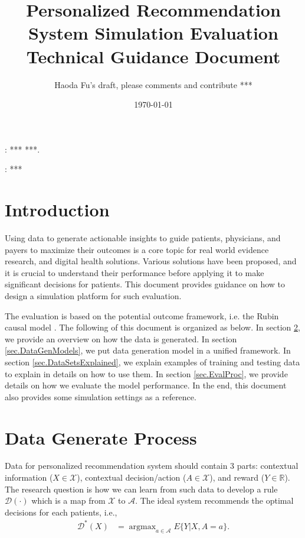 \documentclass[12pt]{article}
\DeclareMathOperator*{\argmax}{argmax}
\def\cal{\mathcal}
\def\calA{{\cal A}} %
\def\calX{{\cal X}} %
\def\calD{{\cal D}} %
\def\bbR{{\mathbb{R}}} %
\begin{document}
\title
{\bf Personalized Recommendation System Simulation Evaluation Technical Guidance Document}
\author
{
Haoda Fu's draft, please comments and contribute *** \\
}
\date{\today}
\maketitle
\begin{abstract}

\end{abstract}

: *** ***.

: ***


\newpage

\section{Introduction}
Using data to generate actionable insights to guide patients, physicians, and payers to maximize their outcomes is a core topic for real world evidence research, and digital health solutions.  Various solutions have been proposed, and it is crucial to understand their performance before applying it to make significant decisions for patients. This document provides guidance on how to design a simulation platform for such evaluation. 

The evaluation is based on the potential outcome framework, i.e. the Rubin causal model  \cite{holland1986statistics}.  The following of this document is organized as below. In section \ref{sec.DataGenProc}, we provide an overview on how the data is generated. In section \ref{sec.DataGenModels}, we put data generation model in a unified framework.
In section \ref{sec.DataSetsExplained}, we explain examples of training and testing data to explain in details on how to use them. In section \ref{sec.EvalProc}, we provide details on how we evaluate the model performance.  In the end, this document also provides some simulation settings as a reference. 

\section{Data Generate Process} \label{sec.DataGenProc}
Data for personalized recommendation system should contain 3 parts: contextual information ($X \in \calX $), contextual decision/action ($A \in \calX $), and reward ($Y \in \bbR $). The research question is how we can learn from such data to develop a rule $\calD(\cdot)$ which is a map from $\calX$ to $\calA$.  The ideal system recommends the optimal decisions for each patients, i.e.,
\begin{align*}
\calD^*(X) & = \argmax_{a \in \calA}  E\{Y|X, A=a\}.
\end{align*} 
\end{document}
